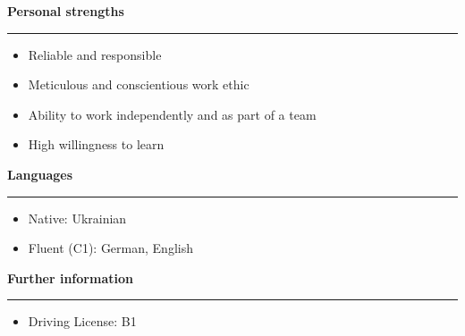 \documentclass[12pt]{article} %
\newcommand{\HighlightedText}[1] {{\textbf{#1}}}
\newenvironment{ItemizeSection}[1]{
    \vspace{1mm}
    \HighlightedText{#1}
    \vspace{0.5mm}
    {\color{custom_blue} \hrule}
    \begin{itemize}[left=0.5em, topsep=0pt, itemsep=0pt, label={$\bullet$}]
}{
    \end{itemize}
}
\begin{document}
\begin{ItemizeSection}{Personal strengths}
    \item Reliable and responsible
    \item Meticulous and conscientious work ethic
    \item Ability to work independently and as part of a team
    \item High willingness to learn
\end{ItemizeSection}

\begin{ItemizeSection}{Languages}
    \item Native: Ukrainian
    \item Fluent (C1): German, English
\end{ItemizeSection}

\begin{ItemizeSection}{Further information}
    \item Driving License: B1
\end{ItemizeSection}
\end{document}
